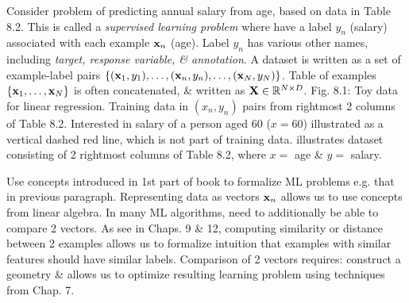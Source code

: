 \documentclass{article}
\begin{document}
\begin{enumerate}
\begin{itemize}
\begin{itemize}
\begin{itemize}
				Consider problem of predicting annual salary from age, based on data in Table 8.2. This is called a {\it supervised learning problem} where have a label $y_n$ (salary) associated with each example ${\bf x}_n$ (age). Label $y_n$ has various other names, including {\it target, response variable, \& annotation}. A dataset is written as a set of example-label pairs $\{({\bf x}_1,y_1),\ldots,({\bf x}_n,y_n),\ldots,({\bf x}_N,y_N)\}$. Table of examples $\{{\bf x}_1,\ldots,{\bf x}_N\}$ is often concatenated, \& written as ${\bf X}\in\mathbb{R}^{N\times D}$. {\sf Fig. 8.1: Toy data for linear regression. Training data in $(x_n,y_n)$ pairs from rightmost 2 columns of Table 8.2. Interested in salary of a person aged 60 ($x = 60$) illustrated as a vertical dashed red line, which is not part of training data.} illustrates dataset consisting of 2 rightmost columns of Table 8.2, where $x =$ age \& $y =$ salary.
				
				Use concepts introduced in 1st part of book to formalize ML problems e.g. that in previous paragraph. Representing data as vectors ${\bf x}_n$ allows us to use concepts from linear algebra. In many ML algorithms, need to additionally be able to compare 2 vectors. As see in Chaps. 9 \& 12, computing similarity or distance between 2 examples allows us to formalize intuition that examples with similar features should have similar labels. Comparison of 2 vectors requires: construct a geometry \& allows us to optimize resulting learning problem using techniques from Chap. 7.
				

\end{itemize}
\end{itemize}
\end{itemize}
\end{enumerate}
\end{document}
